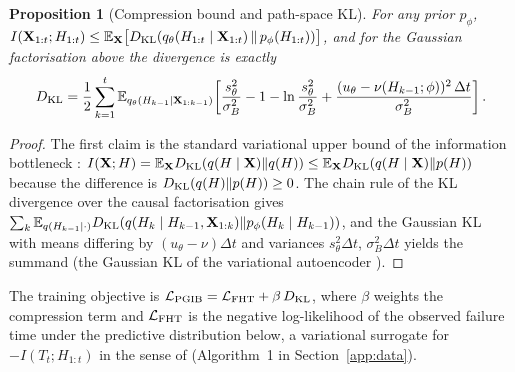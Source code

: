 \documentclass[preprint,12pt]{elsarticle}
\newtheorem{proposition}{Proposition}
\theoremstyle{definition}
\newcommand{\E}{\mathbb{E}}
\begin{document}
\begin{proposition}[Compression bound and path-space KL]
\label{prop:kl}
For any prior $p_\phi$, $I(\mathbf{X}_{1:t};H_{1:t})\le \E_{\mathbf{X}}\big[D_{\rm KL}(q_\theta(H_{1:t}\mid\mathbf{X}_{1:t})\,\|\,p_\phi(H_{1:t}))\big]$, and for the Gaussian factorisation above the divergence is exactly
\begin{equation}
D_{\rm KL}=\frac12\sum_{k=1}^{t}\E_{q_\theta(H_{k-1}\mid\mathbf{X}_{1:k-1})}\!\left[\frac{s_\theta^2}{\sigma_B^2}-1-\ln\frac{s_\theta^2}{\sigma_B^2}+\frac{(u_\theta-\nu(H_{k-1};\phi))^2\,\Delta t}{\sigma_B^2}\right].
\end{equation}
\end{proposition}
\begin{proof}
The first claim is the standard variational upper bound of the information bottleneck \cite{tishby2000,alemi2017,poole2019}: $I(\mathbf{X};H)=\E_{\mathbf{X}}D_{\rm KL}(q(H\mid\mathbf{X})\|q(H))\le\E_{\mathbf{X}}D_{\rm KL}(q(H\mid\mathbf{X})\|p(H))$ because the difference is $D_{\rm KL}(q(H)\|p(H))\ge0$. The chain rule of the KL divergence \cite[Sect.~2.5]{cover2006} over the causal factorisation gives $\sum_k\E_{q(H_{k-1}\mid\cdot)}D_{\rm KL}(q(H_k\mid H_{k-1},\mathbf{X}_{1:k})\|p_\phi(H_k\mid H_{k-1}))$, and the Gaussian KL with means differing by $(u_\theta-\nu)\Delta t$ and variances $s_\theta^2\Delta t$, $\sigma_B^2\Delta t$ yields the summand (the Gaussian KL of the variational autoencoder \cite{kingma2014}).
\end{proof}
The training objective is $\mathcal{L}_{\rm PGIB}=\mathcal{L}_{\rm FHT}+\beta\,D_{\rm KL}$, where $\beta$ weights the compression term and $\mathcal{L}_{\rm FHT}$ is the negative log-likelihood of the observed failure time under the predictive distribution below, a variational surrogate for $-I(T_t;H_{1:t})$ in the sense of \cite{alemi2017} (Algorithm~1 in Section~\ref{app:data}).
\end{document}
